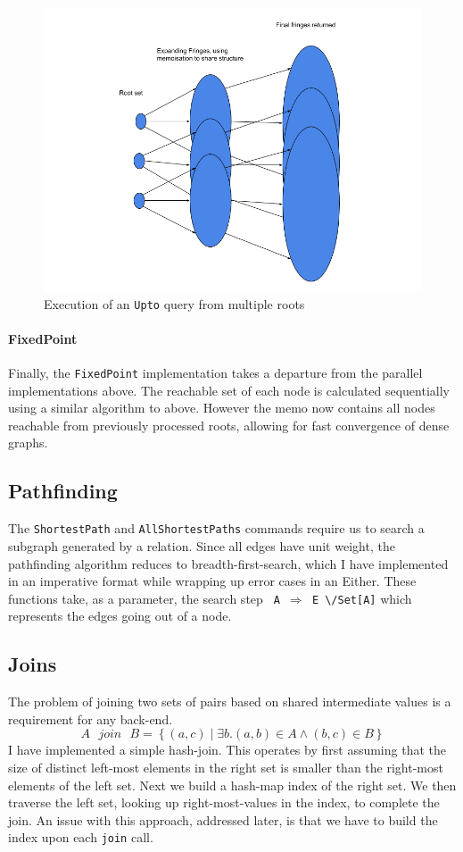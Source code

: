 \documentclass[12pt,a4paper,twoside,openright]{report}
\newcommand\codeName[1]{\texttt{#1}}
\newcommand\either[0]{\textbackslash/}
\newcommand{\setComp}[2]{\left\lbrace #1 \mid #2 \right\rbrace}
\begin{document}
\begin{figure}[ht]
\centering
  \includegraphics[width=\textwidth]{figs/UptoPairs.png}
  \caption{Execution of an \codeName{Upto} query from multiple roots}
  \label{fig:UptoPairs}
\end{figure}
		
		\paragraph{FixedPoint}
Finally, the \codeName{FixedPoint} implementation takes a departure from the parallel implementations above. The reachable set of each node is calculated sequentially using a similar algorithm to above. However the memo now contains all nodes reachable from previously processed roots, allowing for fast convergence of dense graphs.	
	
	\subsection{Pathfinding}
	The \codeName{ShortestPath} and \codeName{AllShortestPaths} commands require us to search a subgraph generated by a relation. Since all edges have unit weight, the pathfinding algorithm reduces to breadth-first-search, which I have implemented in an imperative format while wrapping up error cases in an Either. These functions take, as a parameter, the search step \codeName{ A\ $\Rightarrow$ E \either Set[A]} which represents the edges going out of a node. 
	
	\subsection{Joins}
	The problem of joining two sets of pairs based on shared intermediate values is a requirement for any back-end. 
\[
A\mbox{ }join\mbox{ }B = \setComp{(a, c)}{\exists b. (a, b) \in A \wedge (b, c) \in B}
\]	
I have implemented a simple hash-join\cite{HashJoins}. This operates by first assuming that the size of distinct left-most elements in the right set is smaller than the right-most elements of the left set. Next we build a hash-map index of the right set. We then traverse the left set, looking up right-most-values in the index, to complete the join. An issue with this approach, addressed later, is that we have to build the index upon each \codeName{join} call.
\end{document}

